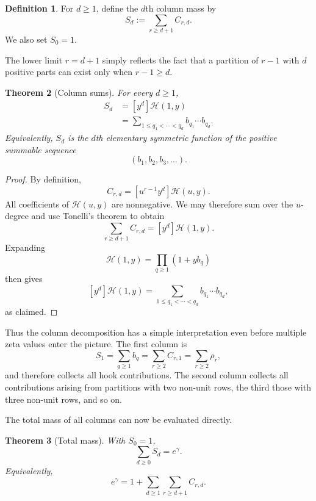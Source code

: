 \documentclass[11pt]{article}
\newtheorem{theorem}{Theorem}[section]
\theoremstyle{definition}
\newtheorem{definition}[theorem]{Definition}
\begin{document}
\begin{definition}
For $d\geq1$, define the $d$th column mass by
\begin{equation}\label{eq:Sd-def}
        S_d
        :=
        \sum_{r\geq d+1}C_{r,d}.
\end{equation}
We also set $S_0=1$.
\end{definition}

The lower limit $r=d+1$ simply reflects the fact that a partition
of $r-1$ with $d$ positive parts can exist only when $r-1\geq d$.

\begin{theorem}[Column sums]\label{thm:columns}
For every $d\geq1$,
\begin{equation}\label{eq:Sd}
 \begin{aligned}
        S_d
        &=
        [y^d]\mathscr H(1,y)\\
        &=
        \sum_{1\leq q_1<\cdots<q_d}
        b_{q_1}\cdots b_{q_d}.
 \end{aligned}
\end{equation}
Equivalently, $S_d$ is the $d$th elementary symmetric function of
the positive summable sequence
\[
        (b_1,b_2,b_3,\ldots).
\]
\end{theorem}

\begin{proof}
By definition,
\[
        C_{r,d}
        =
        [u^{r-1}y^d]\mathscr H(u,y).
\]
All coefficients of $\mathscr H(u,y)$ are nonnegative.  We may
therefore sum over the $u$-degree and use Tonelli's theorem to obtain
\[
 \sum_{r\geq d+1}C_{r,d}
 =
 [y^d]\mathscr H(1,y).
\]
Expanding
\[
        \mathscr H(1,y)
        =
        \prod_{q\geq1}(1+yb_q)
\]
then gives
\[
 [y^d]\mathscr H(1,y)
 =
 \sum_{1\leq q_1<\cdots<q_d}
 b_{q_1}\cdots b_{q_d},
\]
as claimed.
\end{proof}

Thus the column decomposition has a simple interpretation even before
multiple zeta values enter the picture.  The first column is
\[
        S_1=\sum_{q\geq1}b_q
            =\sum_{r\geq2}C_{r,1}
            =\sum_{r\geq2}\rho_r,
\]
and therefore collects all hook contributions.  The second column
collects all contributions arising from partitions with two non-unit
rows, the third those with three non-unit rows, and so on.

The total mass of all columns can now be evaluated directly.

\begin{theorem}[Total mass]\label{thm:totalmass}
With $S_0=1$,
\begin{equation}\label{eq:egamma-columns}
        \sum_{d\geq0}S_d=e^\gamma.
\end{equation}
Equivalently,
\begin{equation}\label{eq:egamma-array}
        e^\gamma
        =
        1+
        \sum_{d\geq1}
        \sum_{r\geq d+1}C_{r,d}.
\end{equation}
\end{theorem}
\end{document}
